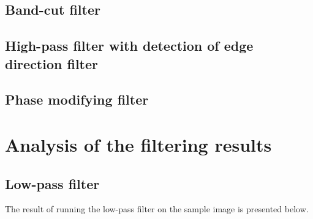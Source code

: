 \documentclass[12pt]{article}
\begin{document}
\subsection{Band-cut filter}
\subsection{High-pass filter with detection of edge direction filter}
\subsection{Phase modifying filter}

\section{Analysis of the filtering results}
\subsection{Low-pass filter}
The result of running the low-pass filter on the sample image is presented below.
\end{document}
